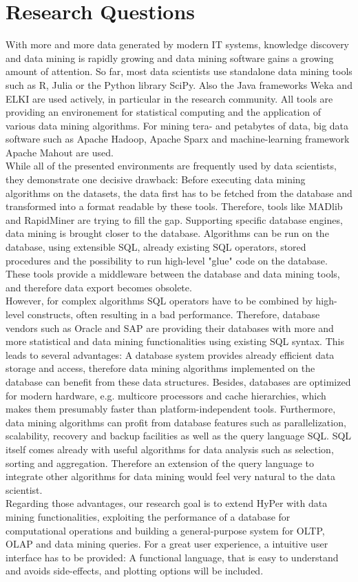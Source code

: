 \section{Research Questions}
With more and more data generated by modern IT systems, knowledge discovery and data mining is rapidly growing and data mining software gains a growing amount of attention. So far, most data scientists use standalone data mining tools such as R, Julia or the Python library SciPy. Also the Java frameworks Weka and ELKI are used actively, in particular in the research community. All tools are providing an environement for statistical computing and the application of various data mining algorithms. For mining tera- and petabytes of data, big data software such as Apache Hadoop, Apache Sparx and machine-learning framework Apache Mahout are used.
\\
While all of the presented environments are frequently used by data scientists, they demonstrate one decisive drawback: Before executing data mining algorithms on the datasets, the data first has to be fetched from the database and transformed into a format readable by these tools.
Therefore, tools like MADlib and RapidMiner are trying to fill the gap. Supporting specific database engines, data mining is brought closer to the database. Algorithms can be run on the database, using extensible SQL, already existing SQL operators, stored procedures and the possibility to run high-level "glue" code on the database. These tools provide a middleware between the database and data mining tools, and therefore data export becomes obsolete. 
\\
However, for complex algorithms SQL operators have to be combined by high-level constructs, often resulting in a bad performance. Therefore, database vendors such as Oracle and SAP are providing their databases with more and more statistical and data mining functionalities using existing SQL syntax. This leads to several advantages: A database system provides already efficient data storage and access, therefore data mining algorithms implemented on the database can benefit from these data structures. Besides, databases are optimized for modern hardware, e.g. multicore processors and cache hierarchies, which makes them presumably faster than platform-independent tools. Furthermore, data mining algorithms can profit from database features such as parallelization, scalability, recovery and backup facilities as well as the query language SQL. SQL itself comes already with useful algorithms for data analysis such as selection, sorting and aggregation. Therefore an extension of the query language to integrate other algorithms for data mining would feel very natural to the data scientist. 
\\
Regarding those advantages, our research goal is to extend HyPer with data mining functionalities, exploiting the performance of a database for computational operations and building a general-purpose system for OLTP, OLAP and data mining queries. For a great user experience, a intuitive user interface has to be provided: A functional language, that is easy to understand and avoids side-effects, and plotting options will be included.


